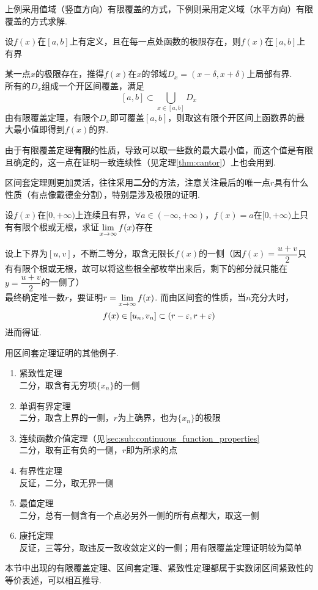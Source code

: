 \par 上例采用值域（竖直方向）有限覆盖的方式，下例则采用定义域（水平方向）有限覆盖的方式求解.
\begin{example}
设$f(x)$在$[a,b]$上有定义，且在每一点处函数的极限存在，则$f(x)$在$[a,b]$上有界
\end{example}
\begin{analysis}
某一点$x$的极限存在，推得$f(x)$在$x$的邻域$D_x=(x-\delta,x+\delta)$上局部有界.\\
所有的$D_x$组成一个开区间覆盖，满足
\[[a,b]\subset\bigcup_{x\in[a,b]}D_x\]
由有限覆盖定理，有限个$D_x$即可覆盖$[a,b]$，则取这有限个开区间上函数界的最大最小值即得到$f(x)$的界.
\end{analysis}
\par 由于有限覆盖定理\textbf{有限}的性质，导致可以取一些数的最大最小值，而这个值是有限且确定的，这一点在证明一致连续性（见定理\ref{thm:cantor}）上也会用到.
\par 区间套定理则更加灵活，往往采用\textbf{二分}的方法，注意关注最后的唯一点$r$具有什么性质（有点像戴德金分割），特别是涉及极限的证明.
\begin{example}
设$f(x)$在$[0,+\infty)$上连续且有界，$\forall a\in(-\infty,+\infty)$，$f(x)=a$在$[0,+\infty)$上只有有限个根或无根，求证$\displaystyle\lim_{x\to\infty}f(x)$存在
\end{example}
\begin{analysis}
设上下界为$[u,v]$，不断二等分，取含无限长$f(x)$的一侧（因$f(x)=\dfrac{u+v}{2}$只有有限个根或无根，故可以将这些根全部枚举出来后，剩下的部分就只能在$y=\dfrac{u+v}{2}$的一侧了）\\
最终确定唯一数$r$，要证明$r=\displaystyle\lim_{x\to\infty}f(x)$.
而由区间套的性质，当$n$充分大时，
\[f(x)\in[u_n,v_n]\subset(r-\varepsilon,r+\varepsilon)\]
进而得证.
\end{analysis}
\par 用区间套定理证明的其他例子.
\begin{example}
\begin{enumerate}
	\itemsep -2pt
	\item 紧致性定理\\
	二分，取含有无穷项$\{x_n\}$的一侧
	\item 单调有界定理\\
	二分，取含上界的一侧，$r$为上确界，也为$\{x_n\}$的极限
	\item 连续函数介值定理（见\ref{sec:sub:continuous_function_properties}\\
	二分，取有正有负的一侧，$r$即为所求的点
	\item 有界性定理\\
	反证，二分，取无界一侧
	\item 最值定理\\
	二分，总有一侧含有一个点必另外一侧的所有点都大，取这一侧
	\item 康托定理\\
	反证，三等分，取违反一致收敛定义的一侧；用有限覆盖定理证明较为简单
\end{enumerate}
\end{example}
\par 本节中出现的有限覆盖定理、区间套定理、紧致性定理都属于实数闭区间紧致性的等价表述，可以相互推导.

